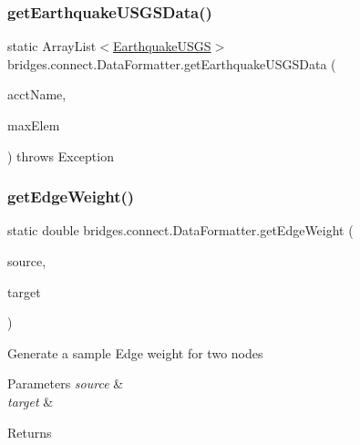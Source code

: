 \subsubsection{\texorpdfstring{get\+Earthquake\+U\+S\+G\+S\+Data()}{getEarthquakeUSGSData()}}
{\footnotesize\ttfamily static Array\+List$<$\hyperlink{classbridges_1_1data__src__dependent_1_1_earthquake_u_s_g_s}{Earthquake\+U\+S\+GS}$>$ bridges.\+connect.\+Data\+Formatter.\+get\+Earthquake\+U\+S\+G\+S\+Data (\begin{DoxyParamCaption}\item[{\hyperlink{classbridges_1_1data__src__dependent_1_1_u_s_g_saccount}{U\+S\+G\+Saccount}}]{acct\+Name,  }\item[{int}]{max\+Elem }\end{DoxyParamCaption}) throws Exception\hspace{0.3cm}{\ttfamily [static]}}

\hypertarget{classbridges_1_1connect_1_1_data_formatter_a2637c733e7f4efccfb56de0940506318}{}\label{classbridges_1_1connect_1_1_data_formatter_a2637c733e7f4efccfb56de0940506318} 
\subsubsection{\texorpdfstring{get\+Edge\+Weight()}{getEdgeWeight()}}
{\footnotesize\ttfamily static double bridges.\+connect.\+Data\+Formatter.\+get\+Edge\+Weight (\begin{DoxyParamCaption}\item[{String}]{source,  }\item[{String}]{target }\end{DoxyParamCaption})\hspace{0.3cm}{\ttfamily [static]}}

Generate a sample Edge weight for two nodes 
\begin{DoxyParams}{Parameters}
{\em source} & \\
\hline
{\em target} & \\
\hline
\end{DoxyParams}
\begin{DoxyReturn}{Returns}

\end{DoxyReturn}
\hypertarget{classbridges_1_1connect_1_1_data_formatter_a4098317468be22b4284156d6cd2212e1}{}\label{classbridges_1_1connect_1_1_data_formatter_a4098317468be22b4284156d6cd2212e1} 
